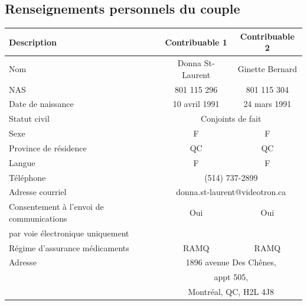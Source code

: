 \subsection{Renseignements personnels du couple}
\begin{center}
	\begin{tabular}{|l|c|c|}
		\hline
		\rowcolor{LightGreen} \textbf{Description} & \textbf{Contribuable 1} & \textbf{Contribuable 2}  \\ \hline
		Nom                                        &    Donna St-Laurent     &     Ginette Bernard      \\ \hline
		NAS                                        &       801 115 296       &       801 115 304        \\ \hline
		Date de naissance                          &      10 avril 1991      &       24 mars 1991       \\ \hline
		Statut civil                               &       \multicolumn{2}{c|}{Conjoints de fait}       \\ \hline
		Sexe                                       &            F            &            F             \\ \hline
		Province de résidence                      &           QC            &            QC            \\ \hline
		Langue                                     &            F            &            F             \\ \hline
		Téléphone                                  &        \multicolumn{2}{c|}{(514) 737-2899}         \\ \hline
		Adresse courriel                           & \multicolumn{2}{c|}{donna.st-laurent@videotron.ca} \\ \hline
		Consentement à l'envoi de communications   &           Oui           &           Oui            \\
		par voie électronique uniquement           &                         &                          \\ \hline
		Régime d'assurance médicaments             &          RAMQ           &           RAMQ           \\ \hline
		Adresse                                    &    \multicolumn{2}{c|}{1896 avenue Des Chênes,}    \\
		                                           &           \multicolumn{2}{c|}{appt 505,}           \\
		                                           &     \multicolumn{2}{c|}{Montréal, QC, H2L 4J8}     \\ \hline

\end{tabular}
\end{center}
